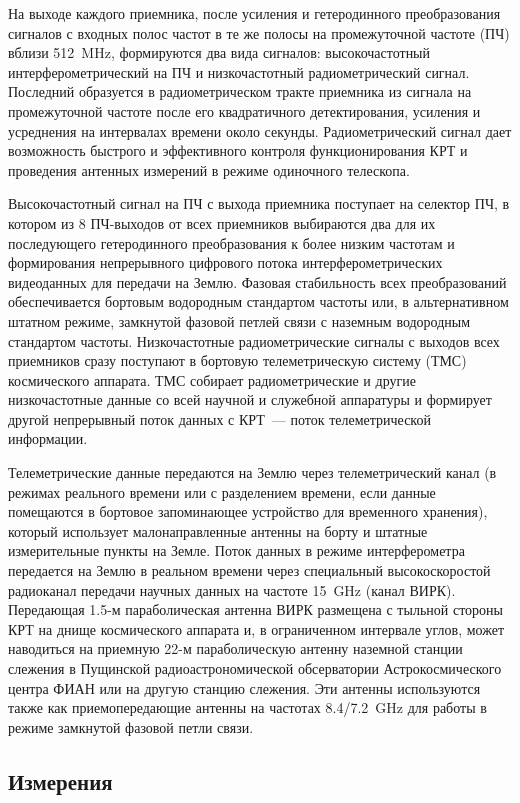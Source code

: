 На выходе каждого приемника, после усиления и гетеродинного преобразования сигналов с входных полос
частот в те же полосы на промежуточной частоте (ПЧ) вблизи \SI{512}{\MHz}, формируются два вида
сигналов: высокочастотный интерферометрический на ПЧ и низкочастотный радиометрический сигнал.
Последний образуется в радиометрическом тракте приемника из сигнала на промежуточной частоте после
его квадратичного детектирования, усиления и усреднения на интервалах времени около секунды.
Радиометрический сигнал дает возможность быстрого и эффективного контроля функционирования КРТ и
проведения антенных измерений в режиме одиночного телескопа.

Высокочастотный сигнал на ПЧ с выхода приемника поступает на селектор ПЧ, в котором из 8 ПЧ-выходов
от всех приемников выбираются два для их последующего гетеродинного преобразования к более низким
частотам и формирования непрерывного цифрового потока интерферометрических видеоданных для передачи
на Землю. Фазовая стабильность всех преобразований обеспечивается бортовым водородным стандартом
частоты или, в альтернативном штатном режиме, замкнутой фазовой петлей связи с наземным водородным
стандартом частоты. Низкочастотные радиометрические сигналы с выходов всех приемников сразу
поступают в бортовую телеметрическую систему (ТМС) космического аппарата. ТМС собирает
радиометрические и другие низкочастотные данные со всей научной и служебной аппаратуры и формирует
другой непрерывный поток данных с КРТ~--- поток телеметрической информации.

Телеметрические данные передаются на Землю через телеметрический канал (в режимах реального времени
или с разделением времени, если данные помещаются в бортовое запоминающее устройство для временного
хранения), который использует малонаправленные антенны на борту и штатные измерительные пункты на
Земле. Поток данных в режиме интерферометра передается на Землю в реальном времени через специальный
высокоскоростой радиоканал передачи научных данных на частоте \SI{15}{\GHz} (канал ВИРК). Передающая
1.5-м параболическая антенна ВИРК размещена с тыльной стороны КРТ на днище космического аппарата и,
в ограниченном интервале углов, может наводиться на приемную 22-м параболическую антенну наземной
станции слежения в Пущинской радиоастрономической обсерватории Астрокосмического центра ФИАН или на
другую станцию слежения. Эти антенны используются также как приемопередающие антенны на частотах
\num{8.4}/\SI{7.2}{\GHz} для работы в режиме замкнутой фазовой петли связи.


\subsection{Измерения}



